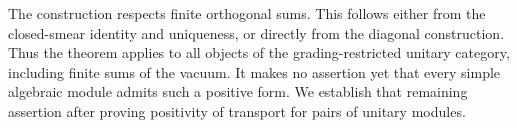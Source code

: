The construction respects finite orthogonal sums.  This follows either
from the closed-smear identity and uniqueness, or directly from the
diagonal construction.  Thus the theorem applies to all objects of
the grading-restricted unitary category, including finite sums of the
vacuum.  It makes no assertion yet that every simple algebraic module
admits such a positive form.  We establish that remaining assertion
after proving positivity of transport for pairs of unitary modules.
